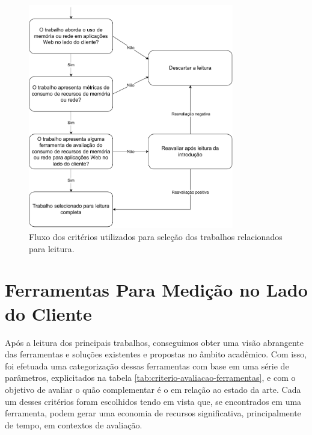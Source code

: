 \documentclass[12pt]{tcc}
\begin{document}
	\begin{figure}[H]
		\centering
		\includegraphics[width=0.8\textwidth]{figures/fluxo-decisao-leitura.pdf}
		\caption[Fluxo de seleção de trabalhos]{Fluxo dos critérios utilizados para seleção dos trabalhos relacionados para leitura.}
		\label{fig:fluxo-leitura}
	\end{figure}

	\section{Ferramentas Para Medição no Lado do Cliente}
	\label{sec:ferramentas-medicao-clientside}

	Após a leitura dos principais trabalhos, conseguimos obter uma visão abrangente das ferramentas e soluções existentes e propostas no âmbito acadêmico. Com isso, foi efetuada uma categorização dessas ferramentas com base em uma série de parâmetros, explicitados na tabela \ref{tab:criterio-avaliacao-ferramentas}, e com o objetivo de avaliar o quão complementar é o  em relação ao estado da arte. Cada um desses critérios foram escolhidos tendo em vista que, se encontrados em uma ferramenta, podem gerar uma economia de recursos significativa, principalmente de tempo, em contextos de avaliação.
\end{document}
